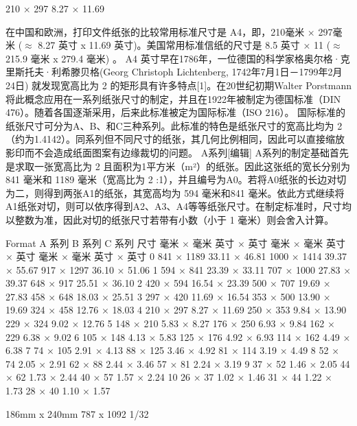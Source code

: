 \documentclass[main.tex]{subfiles}
\begin{document}
210 × 297	8.27 × 11.69

在中国和欧洲，打印文件纸张的比较常用标准尺寸是 A4，即，210毫米 × 297毫米 ($\approx$ 8.27 英寸 x 11.69 英寸)。美国常用标准信纸的尺寸是 8.5 英寸 × 11 ($\approx$ 215.9 毫米 x 279.4 毫米) 。 A4 英寸早在1786年，一位德国的科学家格奥尔格·克里斯托夫·利希滕贝格(Georg Christoph Lichtenberg, 1742年7月1日－1799年2月24日) 就发现宽高比为
2
的矩形具有许多特点[1]。在20世纪初期Walter Porstmann将此概念应用在一系列纸张尺寸的制定，并且在1922年被制定为德国标准（DIN 476）。随着各国逐渐采用，后来此标准被定为国际标准（ISO 216）。
国际标准的纸张尺寸可分为A、B、和C三种系列。此标准的特色是纸张尺寸的宽高比均为
2
（约为1.4142）。同系列但不同尺寸的纸张，其几何比例相同，因此可以直接缩放影印而不会造成纸面图案有边缘裁切的问题。
A系列[编辑]
A系列的制定基础首先是求取一张宽高比为
2
且面积为1平方米（m²）的纸张。因此这张纸的宽长分别为 841 毫米和 1189 毫米（宽高比为
2
:1），并且编号为A0。若将A0纸张的长边对切为二，则得到两张A1的纸张，其宽高均为 594 毫米和841 毫米。依此方式继续将A1纸张对切，则可以依序得到A2、A3、A4等等纸张尺寸。在制定标准时，尺寸均以整数为准，因此对切的纸张尺寸若带有小数（小于 1 毫米）则会舍入计算。

Format	A 系列	B 系列	C 系列
尺寸	毫米 × 毫米	英寸 × 英寸	毫米 × 毫米	英寸 × 英寸	毫米 × 毫米	英寸 × 英寸
0	841 × 1189	33.11 × 46.81	1000 × 1414	39.37 × 55.67	917 × 1297	36.10 × 51.06
1	594 × 841	23.39 × 33.11	707 × 1000	27.83 × 39.37	648 × 917	25.51 × 36.10
2	420 × 594	16.54 × 23.39	500 × 707	19.69 × 27.83	458 × 648	18.03 × 25.51
3	297 × 420	11.69 × 16.54	353 × 500	13.90 × 19.69	324 × 458	12.76 × 18.03
4	210 × 297	8.27 × 11.69	250 × 353	9.84 × 13.90	229 × 324	9.02 × 12.76
5	148 × 210	5.83 × 8.27	176 × 250	6.93 × 9.84	162 × 229	6.38 × 9.02
6	105 × 148	4.13 × 5.83	125 × 176	4.92 × 6.93	114 × 162	4.49 × 6.38
7	74 × 105	2.91 × 4.13	88 × 125	3.46 × 4.92	81 × 114	3.19 × 4.49
8	52 × 74	2.05 × 2.91	62 × 88	2.44 × 3.46	57 × 81	2.24 × 3.19
9	37 × 52	1.46 × 2.05	44 × 62	1.73 × 2.44	40 × 57	1.57 × 2.24
10	26 × 37	1.02 × 1.46	31 × 44	1.22 × 1.73	28 × 40	1.10 × 1.57


186mm x 240mm
787 x 1092 1/32 
\newpage
\end{document}
